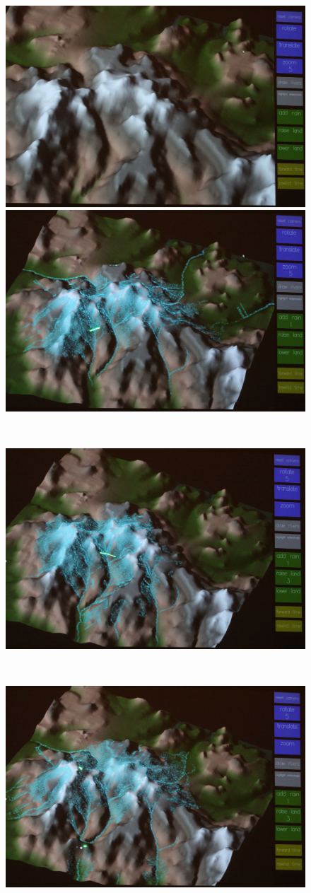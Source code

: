 \begin{figure}
  \begin{center}
  \begin{minipage}{0.79\linewidth}
    \includegraphics[width=0.49\linewidth]{images/terrain1.jpg}
    \includegraphics[width=0.49\linewidth]{images/terrain2.jpg}
  \end{minipage}  \\
  \begin{minipage}{0.79\linewidth}
    \includegraphics[width=0.99\linewidth]{images/terrain3.jpg}     
  \end{minipage}  \\
  \begin{minipage}{0.79\linewidth}
    \includegraphics[width=0.49\linewidth]{images/terrain4.jpg}

\end{minipage}
\end{center}
\end{figure}
